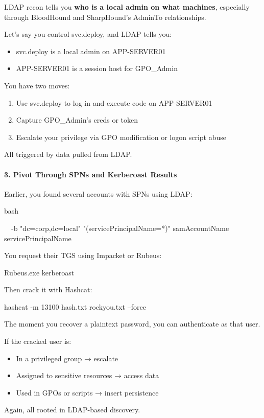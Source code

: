 LDAP recon tells you \textbf{who is a local admin on what machines}, especially through BloodHound and SharpHound’s AdminTo relationships.

Let’s say you control svc.deploy, and LDAP tells you:

\begin{itemize}
    \item svc.deploy is a local admin on APP-SERVER01

    \item APP-SERVER01 is a session host for GPO\_Admin

\end{itemize}
You have two moves:

\begin{enumerate}
    \item Use svc.deploy to log in and execute code on APP-SERVER01

    \item Capture GPO\_Admin's creds or token

    \item Escalate your privilege via GPO modification or logon script abuse

\end{enumerate}
All triggered by data pulled from LDAP.

\paragraph{\textbf{   3. Pivot Through SPNs and Kerberoast Results}}

Earlier, you found several accounts with SPNs using LDAP:

bash

 


  -b "dc=corp,dc=local" "(servicePrincipalName=*)" samAccountName servicePrincipalName

You request their TGS using Impacket or Rubeus:

Rubeus.exe kerberoast

Then crack it with Hashcat:

hashcat -m 13100 hash.txt rockyou.txt --force

The moment you recover a plaintext password, you can authenticate as that user.

If the cracked user is:

\begin{itemize}
    \item In a privileged group → escalate

    \item Assigned to sensitive resources → access data

    \item Used in GPOs or scripts → insert persistence

\end{itemize}
Again, all rooted in LDAP-based discovery.


